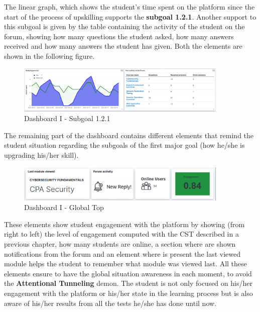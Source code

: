 The linear graph, which shows the student's time spent on the platform since the start of
the process of upskilling supports the \textbf{subgoal 1.2.1}. Another support to this subgoal
is given by the table containing the activity of the student on the forum, showing how many questions 
the student asked, how many answers received and how many answers the student has given. Both the 
elements are shown in the following figure.

\begin{figure}[H]
    \centering
    \includegraphics[width=0.9\textwidth]{assets/dashboard_1_121.png}
    \caption{Dashboard I - Subgoal 1.2.1}
    \label{fig:dashboard_1_subgoal_121}
\end{figure}


The remaining part of the dashboard contains different elements that remind the student
situation regarding the subgoals of the first major goal (how he/she is upgrading 
his/her skill). 

\begin{figure}[H]
    \centering
    \includegraphics[width=0.9\textwidth]{assets/dashboard_1_globaltop.png}
    \caption{Dashboard I - Global Top}
    \label{fig:dashboard_1_global_top}
\end{figure}

These elements show student engagement with the platform by showing (from right to left)
the level of engagement computed with the CST described in a previous chapter,
how many students are online, a section
where are shown notifications from the forum 
and an element where is present the last viewed module helps the student
to remember what module was viewed last.
All these elements ensure to have the global situation awareness in each moment, 
to avoid the \textbf{Attentional Tunneling} demon. The student is not only focused
on his/her engagement with the platform or his/her state in the learning process but is
also aware of his/her results from all the tests he/she has done until now.

